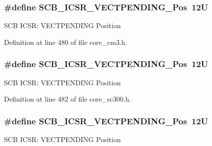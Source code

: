 \subsubsection[{\texorpdfstring{S\+C\+B\+\_\+\+I\+C\+S\+R\+\_\+\+V\+E\+C\+T\+P\+E\+N\+D\+I\+N\+G\+\_\+\+Pos}{SCB_ICSR_VECTPENDING_Pos}}]{\setlength{\rightskip}{0pt plus 5cm}\#define S\+C\+B\+\_\+\+I\+C\+S\+R\+\_\+\+V\+E\+C\+T\+P\+E\+N\+D\+I\+N\+G\+\_\+\+Pos~12U}\hypertarget{group___c_m_s_i_s___s_c_b_gada60c92bf88d6fd21a8f49efa4a127b8}{}\label{group___c_m_s_i_s___s_c_b_gada60c92bf88d6fd21a8f49efa4a127b8}
S\+CB I\+C\+SR\+: V\+E\+C\+T\+P\+E\+N\+D\+I\+NG Position 

Definition at line 480 of file core\+\_\+cm3.\+h.

\subsubsection[{\texorpdfstring{S\+C\+B\+\_\+\+I\+C\+S\+R\+\_\+\+V\+E\+C\+T\+P\+E\+N\+D\+I\+N\+G\+\_\+\+Pos}{SCB_ICSR_VECTPENDING_Pos}}]{\setlength{\rightskip}{0pt plus 5cm}\#define S\+C\+B\+\_\+\+I\+C\+S\+R\+\_\+\+V\+E\+C\+T\+P\+E\+N\+D\+I\+N\+G\+\_\+\+Pos~12U}\hypertarget{group___c_m_s_i_s___s_c_b_gada60c92bf88d6fd21a8f49efa4a127b8}{}\label{group___c_m_s_i_s___s_c_b_gada60c92bf88d6fd21a8f49efa4a127b8}
S\+CB I\+C\+SR\+: V\+E\+C\+T\+P\+E\+N\+D\+I\+NG Position 

Definition at line 482 of file core\+\_\+sc300.\+h.

\subsubsection[{\texorpdfstring{S\+C\+B\+\_\+\+I\+C\+S\+R\+\_\+\+V\+E\+C\+T\+P\+E\+N\+D\+I\+N\+G\+\_\+\+Pos}{SCB_ICSR_VECTPENDING_Pos}}]{\setlength{\rightskip}{0pt plus 5cm}\#define S\+C\+B\+\_\+\+I\+C\+S\+R\+\_\+\+V\+E\+C\+T\+P\+E\+N\+D\+I\+N\+G\+\_\+\+Pos~12U}\hypertarget{group___c_m_s_i_s___s_c_b_gada60c92bf88d6fd21a8f49efa4a127b8}{}\label{group___c_m_s_i_s___s_c_b_gada60c92bf88d6fd21a8f49efa4a127b8}
S\+CB I\+C\+SR\+: V\+E\+C\+T\+P\+E\+N\+D\+I\+NG Position 

